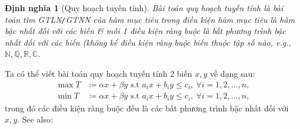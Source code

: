 \documentclass{article}
\newtheorem{dinhnghia}{Định nghĩa}
\begin{document}
\begin{dinhnghia}[Quy hoạch tuyến tính]
	Bài toán \emph{quy hoạch tuyến tính} là bài toán tìm {\rm GTLN{\tt/}GTNN} của \emph{hàm mục tiêu} trong điều kiện hàm mục tiêu là hàm bậc nhất đối với các biến \& mỗi 1 điều kiện ràng buộc là bất phương trình bậc nhất đối với các biến (không kể điều kiện ràng buộc biến thuộc tập số nào, e.g., $\mathbb{N},\mathbb{Q},\mathbb{R},\mathbb{C}$.
\end{dinhnghia}
Ta có thể viết bài toán quy hoạch tuyến tính 2 biến $x,y$ về dạng sau:
\begin{align}
	\max T&\coloneqq\alpha x + \beta y\mbox{ s.t } a_ix + b_iy\le c_i,\ \forall i = 1,2,\ldots,n,\label{linear programming 2 vars max}\tag{lp2max}\\
	\min T&\coloneqq\alpha x + \beta y\mbox{ s.t } a_ix + b_iy\le c_i,\ \forall i = 1,2,\ldots,n,\label{linear programming 2 vars min}\tag{lp2min}
\end{align}
trong đó các điều kiện ràng buộc đều là các bất phương trình bậc nhất đối với $x,y$. See also:
\end{document}
